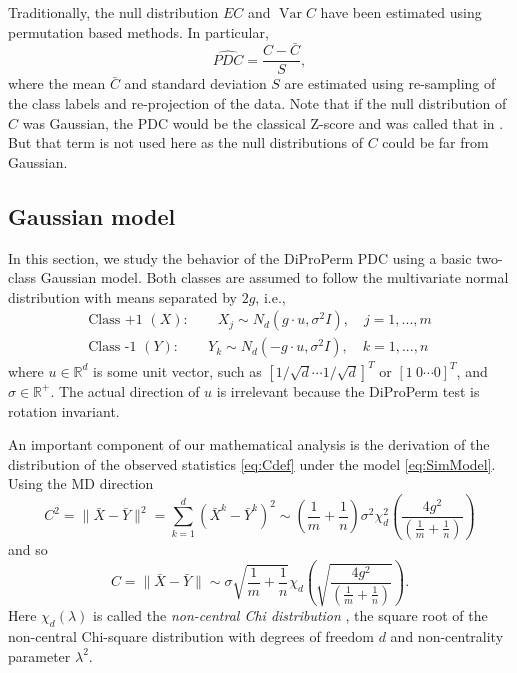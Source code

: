 \documentclass[12pt]{article}
\begin{document}
{Traditionally, the null distribution $EC$ and $\operatorname{Var} C$ have been estimated using permutation based methods. In particular,
\begin{equation}\label{eq:PDC}
\widehat{PDC}=\frac{C-\bar C}{S},
\end{equation}
where the mean $\bar C$ and standard deviation $S$ are estimated using re-sampling of the class labels and re-projection of the data.
Note that if the null distribution of $C$ was Gaussian, the PDC would be the classical Z-score and was called that in  \citet{wei2016direction}. But that term is not used here as the null distributions of $C$ could be far from Gaussian.
}

{
\subsection{Gaussian model}
\label{cbp}
In this section, we study the behavior of the DiProPerm PDC using a basic two-class Gaussian model. Both classes are assumed to follow the multivariate normal distribution with means separated by $2g$, i.e., 
  \begin{equation}\label{eq:SimModel}
 \begin{gathered}
  \mbox{Class +1 } (X):\qquad   X_{j}\sim N_d(g\cdot u,\sigma^2 I),\quad j=1,...,m\\
 \mbox{Class -1 } (Y):\qquad  Y_{k}\sim N_d(-g\cdot u,\sigma^2 I),\quad k=1,...,n
  \end{gathered}
  \end{equation}
where $u\in \mathbb{R}^d$ is some unit vector, such as $[1/\sqrt{d} \cdots 1/\sqrt{d}]^T$ or $[1\ 0 \cdots 0]^T$, and $\sigma \in \mathbb{R}^+$. The actual direction of $u$ is irrelevant because the DiProPerm test is rotation invariant.



An important component of our mathematical analysis is the derivation of the distribution of the observed statistics \eqref{eq:Cdef} under the model \eqref{eq:SimModel}. Using the MD direction
\[
 C^2=\|\bar X-\bar Y\|^2=\sum_{k=1}^d(\bar X^k-\bar Y^k)^2\sim (\frac{1}{m}+\frac{1}{n})\sigma^2 \chi^2_d(\frac{4g^2}{ (\frac{1}{m}+\frac{1}{n})})
\]
and so
\begin{equation}\label{eq:chi}
C=\|\bar X-\bar Y\|\sim \sigma \sqrt{\frac{1}{m}+\frac{1}{n}}\chi_d(\sqrt{\frac{4g^2}{ (\frac{1}{m}+\frac{1}{n})}}).
\end{equation}
Here $\chi_d(\lambda)$ is called the \textit{non-central Chi distribution} \citep{johnson1972continuous},  the square root of the non-central Chi-square distribution with degrees of freedom $d$ and non-centrality parameter $\lambda^2$.

}
\end{document}
